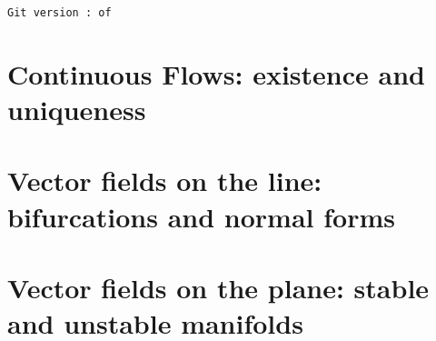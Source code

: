 \documentclass[fleqn]{mc}
\begin{document}
\tableofcontents
\texttt{Git version \gitbranch:\gitrevision \ of \gitdate}

\section{Continuous Flows: existence and uniqueness}


\section{Vector fields on the line: bifurcations and normal forms}


\section{Vector fields on the plane: stable and unstable manifolds}



\end{document}
